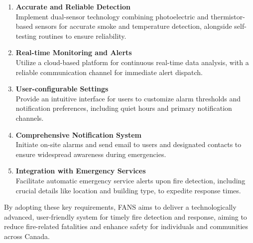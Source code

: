 \begin{enumerate}
    \item \textbf{Accurate and Reliable Detection} \\ Implement dual-sensor technology combining photoelectric and thermistor-based
          sensors for accurate smoke and temperature detection, alongside self-testing routines to ensure reliability.

    \item \textbf{Real-time Monitoring and Alerts} \\ Utilize a cloud-based platform for continuous real-time data analysis, with a
          reliable communication channel for immediate alert dispatch.

    \item \textbf{User-configurable Settings} \\ Provide an intuitive interface for users to customize alarm thresholds and notification
          preferences, including quiet hours and primary notification channels.

    \item \textbf{Comprehensive Notification System} \\ Initiate on-site alarms and send email to users and designated contacts to ensure
          widespread awareness during emergencies.

    \item \textbf{Integration with Emergency Services} \\ Facilitate automatic emergency service alerts upon fire detection, including
          crucial details like location and building type, to expedite response times.

\end{enumerate}

By adopting these key requirements, FANS aims to deliver a technologically advanced, user-friendly system for timely
fire detection and response, aiming to reduce fire-related fatalities and enhance safety for individuals and
communities across Canada.
